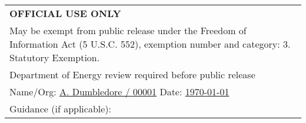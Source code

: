 
\begin{table}[!b]
\vskip50pt
\hskip2.5in
\renewcommand{\arraystretch}{0.9}
\begin{tabular}{|p{3.8in}|}
\hline
\footnotesize{\textbf{OFFICIAL USE ONLY}} \\
\scriptsize{May be exempt from public release under the Freedom of Information
  Act (5 U.S.C. 552), exemption number and category: 3. Statutory Exemption.}  \\
\scriptsize{Department of Energy review required before public release} \\
\scriptsize{Name/Org:  \underline{A. Dumbledore / 00001} Date:
  \underline{\today}}\\ 
\scriptsize{Guidance (if applicable):} \\
\hline
\end{tabular}
\end{table}

